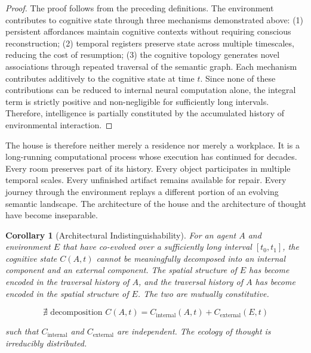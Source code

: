 \documentclass[12pt,oneside]{article}
\newtheorem{corollary}[definition]{Corollary}
\theoremstyle{remark}
\begin{document}
\begin{proof}
The proof follows from the preceding definitions. The environment contributes to cognitive state through three mechanisms demonstrated above: (1) persistent affordances maintain cognitive contexts without requiring conscious reconstruction; (2) temporal registers preserve state across multiple timescales, reducing the cost of resumption; (3) the cognitive topology generates novel associations through repeated traversal of the semantic graph. Each mechanism contributes additively to the cognitive state at time $t$. Since none of these contributions can be reduced to internal neural computation alone, the integral term is strictly positive and non-negligible for sufficiently long intervals. Therefore, intelligence is partially constituted by the accumulated history of environmental interaction.
\end{proof}

The house is therefore neither merely a residence nor merely a workplace. It is a long-running computational process whose execution has continued for decades. Every room preserves part of its history. Every object participates in multiple temporal scales. Every unfinished artifact remains available for repair. Every journey through the environment replays a different portion of an evolving semantic landscape. The architecture of the house and the architecture of thought have become inseparable.

\begin{corollary}[Architectural Indistinguishability]
For an agent $A$ and environment $E$ that have co-evolved over a sufficiently long interval $[t_0, t_1]$, the cognitive state $C(A, t)$ cannot be meaningfully decomposed into an internal component and an external component. The spatial structure of $E$ has become encoded in the traversal history of $A$, and the traversal history of $A$ has become encoded in the spatial structure of $E$. The two are mutually constitutive.

\begin{equation}
\nexists \text{ decomposition } C(A, t) = C_{\text{internal}}(A, t) + C_{\text{external}}(E, t)
\end{equation}

such that $C_{\text{internal}}$ and $C_{\text{external}}$ are independent. The ecology of thought is irreducibly distributed.
\end{corollary}

\end{document}
